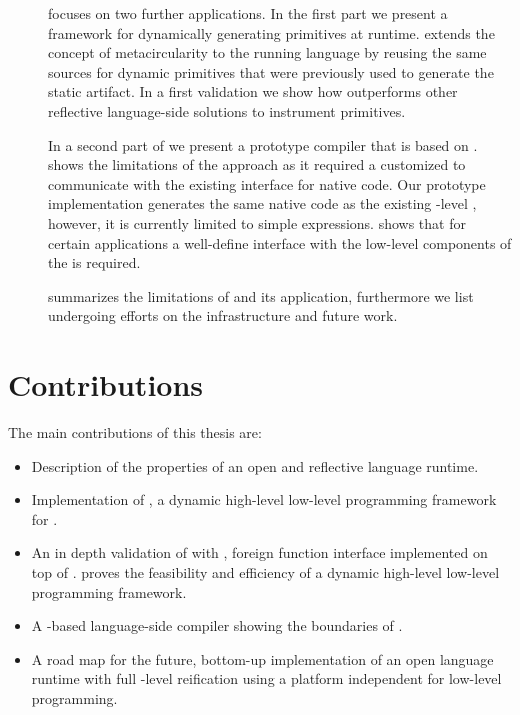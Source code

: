 \begin{description}
\item[] focuses on two further \B applications.
	In the first part we present \WF a framework for dynamically generating primitives at runtime.
	\WF extends the concept of metacircularity to the running language by reusing the same sources for dynamic primitives that were previously used to generate the static \VM artifact.
	In a first validation we show how \WF outperforms other reflective language-side solutions to instrument primitives.
	
	In a second part of  we present \NBJ a prototype \JIT compiler that is based on \B.
	\NBJ shows the limitations of the \B approach as it required a customized \VM to communicate with the existing \JIT interface for native code.
	Our prototype implementation generates the same native code as the existing \VM-level \JIT, however, it is currently limited to simple expressions.
	\NBJ shows that for certain applications a well-define interface with the low-level components of the \VM is required.

\item[] summarizes the limitations of \B and its application, furthermore we list undergoing efforts on the \B infrastructure and future work.

\end{description}

\section{Contributions}
The main contributions of this thesis are:
%
\begin{itemize}
	\item Description of the properties of an open and reflective language runtime.
	
	\item Implementation of \B, a dynamic high-level low-level programming framework for \PH.
	
	\item An in depth validation of \B with \NB, foreign function interface  implemented on top of \B.
	\NB proves the feasibility and efficiency of a dynamic high-level low-level programming framework.
	
	\item A \B-based language-side \JIT compiler showing the boundaries of \B.
	
	\item A road map for the future, bottom-up implementation of an open language runtime with full \VM-level reification using a platform independent \IR for low-level programming.
\end{itemize}


